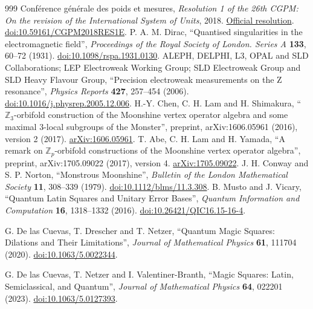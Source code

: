 \begin{thebibliography}{999}
 Conférence générale des poids et mesures, \emph{Resolution 1 of the 26th CGPM: On the revision of the International System of Units}, 2018. \href{https://www.bipm.org/en/committees/cg/cgpm/26-2018/resolution-1}{Official resolution}. \href{https://doi.org/10.59161/CGPM2018RES1E}{doi:10.59161/CGPM2018RES1E}.
 P. A. M. Dirac, ``Quantised singularities in the electromagnetic field'', \emph{Proceedings of the Royal Society of London. Series A} \textbf{133}, 60--72 (1931). \href{https://doi.org/10.1098/rspa.1931.0130}{doi:10.1098/rspa.1931.0130}.
 ALEPH, DELPHI, L3, OPAL and SLD Collaborations; LEP Electroweak Working Group; SLD Electroweak Group and SLD Heavy Flavour Group, ``Precision electroweak measurements on the Z resonance'', \emph{Physics Reports} \textbf{427}, 257--454 (2006). \href{https://doi.org/10.1016/j.physrep.2005.12.006}{doi:10.1016/j.physrep.2005.12.006}.
 H.-Y. Chen, C. H. Lam and H. Shimakura, ``\(\mathbb Z_3\)-orbifold construction of the Moonshine vertex operator algebra and some maximal \(3\)-local subgroups of the Monster'', preprint, arXiv:1606.05961 (2016), version 2 (2017). \href{https://arxiv.org/abs/1606.05961}{arXiv:1606.05961}.
 T. Abe, C. H. Lam and H. Yamada, ``A remark on \(\mathbb Z_p\)-orbifold constructions of the Moonshine vertex operator algebra'', preprint, arXiv:1705.09022 (2017), version 4. \href{https://arxiv.org/abs/1705.09022v4}{arXiv:1705.09022}.
 J. H. Conway and S. P. Norton, ``Monstrous Moonshine'', \emph{Bulletin of the London Mathematical Society} \textbf{11}, 308--339 (1979). \href{https://doi.org/10.1112/blms/11.3.308}{doi:10.1112/blms/11.3.308}.
 B. Musto and J. Vicary, ``Quantum Latin Squares and Unitary Error Bases'', \emph{Quantum Information and Computation} \textbf{16}, 1318--1332 (2016). \href{https://doi.org/10.26421/QIC16.15-16-4}{doi:10.26421/QIC16.15-16-4}.

 G. De las Cuevas, T. Drescher and T. Netzer, ``Quantum Magic Squares: Dilations and Their Limitations'', \emph{Journal of Mathematical Physics} \textbf{61}, 111704 (2020). \href{https://doi.org/10.1063/5.0022344}{doi:10.1063/5.0022344}.

 G. De las Cuevas, T. Netzer and I. Valentiner-Branth, ``Magic Squares: Latin, Semiclassical, and Quantum'', \emph{Journal of Mathematical Physics} \textbf{64}, 022201 (2023). \href{https://doi.org/10.1063/5.0127393}{doi:10.1063/5.0127393}.


\end{thebibliography}

